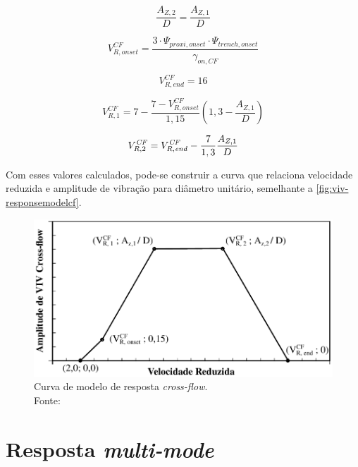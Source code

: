 \begin{equation}
\frac{A_{Z,2}}{D} = \frac{A_{Z,1}}{D}
\end{equation}

\begin{equation}
V_{R,\mathit{onset}}^\mathit{CF} = \frac{3 \cdot \Psi_{\mathit{proxi}, \mathit{onset}} \cdot  \Psi_{\mathit{trench}, \mathit{onset}}}{\gamma_{\mathit{on}, \mathit{CF}}}
\end{equation}

\begin{equation}
V_{R,\mathit{end}}^\mathit{CF} = 16
\end{equation}

\begin{equation}
V_{R, 1}^\mathit{CF} = 7 - \frac{7 - V^\mathit{CF}_{R, \mathit{onset}}}{1,15} \left(1,3 - \frac{A_{Z,1}}{D}\right)
\end{equation}

\begin{equation}
V_{R, 2}^\mathit{CF} = V^\mathit{CF}_{R, \mathit{end}} - \frac{7}{1,3} \frac{A_{Z, 1}}{D}\\
\end{equation}

Com esses valores calculados, pode-se construir a curva que relaciona velocidade reduzida e amplitude de vibração para diâmetro unitário, semelhante a \autoref{fig:viv-responsemodelcf}.

\begin{figure}[th!]
    \centering
    \includegraphics[width=0.8\linewidth]{imagens/response_model_CF}
    \caption[Curva de modelo de resposta \textit{cross-flow}]{Curva de modelo de resposta \textit{cross-flow}.\\Fonte:~}
    \label{fig:viv-responsemodelcf}
\end{figure}


\section{Resposta \textit{multi-mode}}

